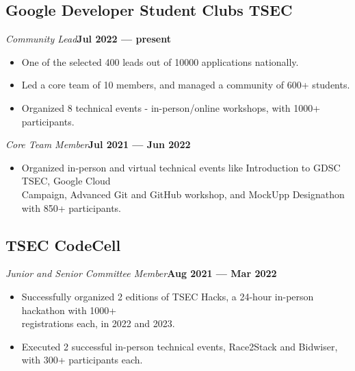 \documentclass[a4,10pt]{article}
\newenvironment{zitemize}{
\begin{itemize}\itemsep0pt \parskip0pt \parsep1pt}
{\end{itemize}\vspace{-0.5cm}}
\begin{document}
\subsection*{ Google Developer Student Clubs TSEC } 
\vspace{-0.05cm}
    \emph{Community Lead}\textbf{\hfill Jul 2022 --- present}
    \begin{zitemize}
    \vspace{-0.2cm}
            \item One of the selected 400 leads out of 10000 applications nationally.
            \item Led a core team of 10 members, and managed a community of 600+ students.
            \item Organized 8 technical events - in-person/online workshops, with 1000+ participants.
    \end{zitemize}
    \vspace{0.4cm}
    \emph{Core Team Member}\textbf{\hfill Jul 2021 --- Jun 2022}
    \begin{zitemize}
    \vspace{-0.2cm}
            \item Organized in-person and virtual technical events like Introduction to GDSC TSEC, Google Cloud \\Campaign, Advanced Git and GitHub workshop, and MockUpp Designathon with 850+ participants.
    \end{zitemize}
    \vspace{-0.05cm}
    
\subsection*{ TSEC CodeCell }
\vspace{-0.05cm}
    \emph{Junior and Senior Committee Member}\textbf{\hfill Aug 2021 --- Mar 2022}
    \begin{zitemize}
    \vspace{-0.2cm}
            \item Successfully organized 2 editions of TSEC Hacks, a 24-hour in-person hackathon with 1000+\\ registrations each, in 2022 and 2023.
            \item Executed 2 successful in-person technical events, Race2Stack and Bidwiser, with 300+ participants each.
    \end{zitemize}
\vspace{-0.2cm}
\end{document}
